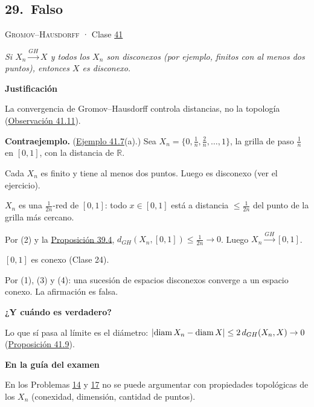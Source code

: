 \documentclass[11pt,a4paper]{article}
\newcommand{\R}{\mathbb{R}}\newcommand{\N}{\mathbb{N}}\newcommand{\Q}{\mathbb{Q}}
\DeclareMathOperator{\diam}{diam}\DeclareMathOperator{\dis}{dis}\DeclareMathOperator{\dist}{dist}
\newcommand{\bloque}[1]{\par\smallskip\noindent\textbf{\color{acento}#1}\par}
\begin{document}
\subsection*{\hypertarget{r-29}{}29.\ \textcolor{bad}{Falso}}
{\small \textsc{Gromov–Hausdorff} · Clase \href{https://decostruttivismo.github.io/MAT2514-repaso/pdf/MAT2514_apuntes_completos.pdf\#nameddest=section.41}{41}}\par
\emph{Si $X_n\xrightarrow{GH}X$ y todos los $X_n$ son disconexos (por ejemplo, finitos con al menos dos puntos), entonces $X$ es disconexo.}
\bloque{Justificación}
\begin{pasos}
\item[] La convergencia de Gromov–Hausdorff controla distancias, no la topología (\href{https://decostruttivismo.github.io/MAT2514-repaso/pdf/MAT2514_apuntes_completos.pdf\#nameddest=teorema.41.11}{Observación 41.11}).
\item[] \textbf{Contraejemplo.} (\href{https://decostruttivismo.github.io/MAT2514-repaso/pdf/MAT2514_apuntes_completos.pdf\#nameddest=teorema.41.7}{Ejemplo 41.7}(a).) Sea $X_n=\{0,\frac1n,\frac2n,\dots,1\}$, la grilla de paso $\frac1n$ en $[0,1]$, con la distancia de $\R$.
\item[(1)] Cada $X_n$ es finito y tiene al menos dos puntos. Luego es disconexo (ver el ejercicio).
\item[(2)] $X_n$ es una $\frac1{2n}$-red de $[0,1]$: todo $x\in[0,1]$ está a distancia $\le\frac1{2n}$ del punto de la grilla más cercano.
\item[(3)] Por (2) y la \href{https://decostruttivismo.github.io/MAT2514-repaso/pdf/MAT2514_apuntes_completos.pdf\#nameddest=teorema.39.4}{Proposición 39.4}, $d_{GH}(X_n,[0,1])\le\frac1{2n}\to0$. Luego $X_n\xrightarrow{GH}[0,1]$.
\item[(4)] $[0,1]$ es conexo (Clase 24).
\item[] Por (1), (3) y (4): una sucesión de espacios disconexos converge a un espacio conexo. La afirmación es falsa.
\end{pasos}
\bloque{¿Y cuándo es verdadero?}
\begin{pasos}
\item[] Lo que sí pasa al límite es el diámetro: $\abs{\diam X_n-\diam X}\le2\,d_{GH}(X_n,X)\to0$ (\href{https://decostruttivismo.github.io/MAT2514-repaso/pdf/MAT2514_apuntes_completos.pdf\#nameddest=teorema.41.9}{Proposición 41.9}).
\end{pasos}
\bloque{En la guía del examen}
\begin{pasos}
\item[] En los Problemas \hyperlink{prob-14}{14} y \hyperlink{prob-17}{17} no se puede argumentar con propiedades topológicas de los $X_n$ (conexidad, dimensión, cantidad de puntos).
\end{pasos}
\end{document}
